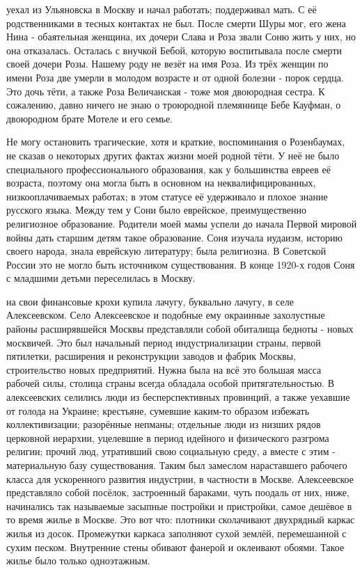 \label{29-1}
уехал из Ульяновска в Москву и начал работать; поддерживал мать. С её родственниками в тесных контактах не был. После смерти Шуры мог, его жена Нина - обаятельная женщина, их дочери Слава и Роза звали Соню жить у них, но она отказалась. Осталась с внучкой Бебой, которую воспитывала после смерти своей дочери Розы. Нашему роду не везёт на имя Роза. Из трёх женщин по имени Роза две умерли в молодом возрасте и от одной болезни - порок сердца. Это дочь тёти, а также Роза Величанская - тоже моя двоюродная сестра. К сожалению, давно ничего не знаю о троюродной племяннице Бебе Кауфман, о двоюродном брате Мотеле и его семье.

\label{29-2}
Не могу остановить трагические, хотя и краткие, воспоминания о Розенбаумах, не сказав о некоторых других фактах жизни моей родной тёти. У неё не было специального профессионального образования, как у большинства евреев её возраста, поэтому она могла быть в основном на неквалифицированных, низкооплачиваемых работах; в этом статусе её удерживало и плохое знание русского языка. Между тем у Сони было еврейское, преимущественно религиозное образование. Родители моей мамы успели до начала Первой мировой войны дать старшим детям такое образование. Соня изучала иудаизм, историю своего народа, знала еврейскую литературу; была религиозна. В Советской России это не могло быть источником существования. В конце 1920-х годов Соня с младшими детьми переселилась в Москву.

\label{30-1}
на свои финансовые крохи купила лачугу, буквально лачугу, в селе Алексеевском. Село Алексеевское и подобные ему окраинные захолустные районы расширявшейся Москвы представляли собой обиталища бедноты - новых москвичей. Это был начальный период индустриализации страны, первой пятилетки, расширения и реконструкции заводов и фабрик Москвы, строительство новых предприятий. Нужна была на всё это большая масса рабочей силы, столица страны всегда обладала особой притягательностью. В алексеевских селились люди из бесперспективных провинций, а также уехавшие от голода на Украине; крестьяне, сумевшие каким-то образом избежать коллективизации; разорённые непманы; отдельные люди из низших рядов церковной иерархии, уцелевшие в период идейного и физического разгрома религии; прочий люд, утративший свою социальную среду, а вместе с этим - материальную базу существования. Таким был замеслом нараставшего рабочего класса для ускоренного развития индустрии, в частности в Москве. Алексеевское представляло собой посёлок, застроенный бараками, чуть поодаль от них, ниже, начинались так называемые засыпные постройки и пристройки, самое дешёвое в то время жилье в Москве. Это вот что: плотники сколачивают двухрядный каркас жилья из досок. Промежутки каркаса заполняют сухой землёй, перемешанной с сухим песком. Внутренние стены обивают фанерой и оклеивают обоями. Такое жилье было только одноэтажным.

